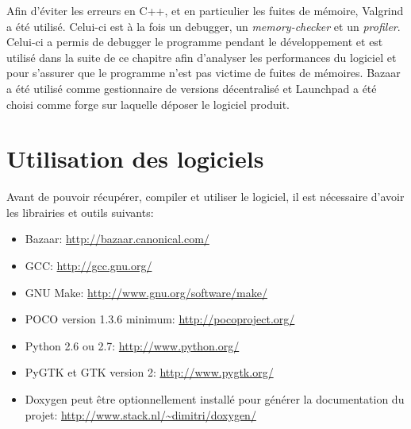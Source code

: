Afin d'éviter les erreurs en C++, et en particulier les fuites de mémoire,
Valgrind\cite{valgrind} a été utilisé. Celui-ci est à la fois un debugger,
un \emph{memory-checker} et un \emph{profiler}. Celui-ci a permis de debugger
le programme pendant le développement et est utilisé dans la suite de ce
chapitre afin d'analyser les performances du logiciel et pour s'assurer que
le programme n'est pas victime de fuites de mémoires.
Bazaar\cite{bzr} a été utilisé comme gestionnaire de versions décentralisé et
Launchpad\cite{launchpad} a été choisi comme forge sur laquelle déposer le
logiciel produit.

\section{Utilisation des logiciels}
Avant de pouvoir récupérer, compiler et utiliser le logiciel, il est nécessaire
d'avoir les librairies et outils suivants:
\begin{itemize}
\item Bazaar: \url{http://bazaar.canonical.com/}
\item GCC: \url{http://gcc.gnu.org/}
\item GNU Make: \url{http://www.gnu.org/software/make/}
\item POCO version 1.3.6 minimum: \url{http://pocoproject.org/}
\item Python 2.6 ou 2.7: \url{http://www.python.org/}
\item PyGTK et GTK version 2: \url{http://www.pygtk.org/}
\item Doxygen peut être optionnellement installé pour générer la documentation
  du projet: \url{http://www.stack.nl/~dimitri/doxygen/}
\end{itemize}

